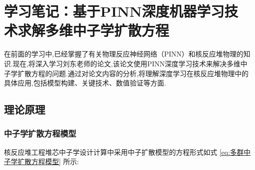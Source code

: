 \documentclass{Sichuan Normal University}
\begin{document}
\section{学习笔记：基于PINN深度机器学习技术求解多维中子学扩散方程}
在前面的学习中,已经掌握了有关物理反应神经网络（PINN）和核反应堆物理的知识.现在,将深入学习刘东老师的论文,该论文使用PINN深度学习技术来解决多维中子学扩散方程的问题.通过对论文内容的分析,将理解深度学习在核反应堆物理中的具体应用,包括模型构建、关键技术、数值验证等方面.
\subsection{理论原理}
\subsubsection{中子学扩散方程模型}
核反应堆工程堆芯中子学设计计算中采用中子扩散模型的方程形式如式 \eqref{eq:多群中子学扩散方程模型} 所示:
\end{document}
